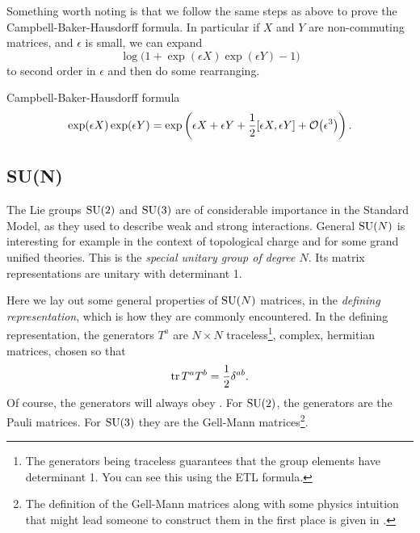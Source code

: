 Something worth noting is that we follow the same steps
as above to prove the Campbell-Baker-Hausdorff formula. In particular
if $X$ and $Y$ are non-commuting matrices, and $\epsilon$ is small,
we can expand
\begin{equation}
  \log\big(1+\exp(\epsilon X)\exp(\epsilon Y)-1\big)
\end{equation}
to second order in $\epsilon$ and then do some rearranging.
\begin{theorem}{Campbell-Baker-Hausdorff formula}{}
  $$
    \exp(\epsilon X)\exp(\epsilon Y)
      =\exp\left(\epsilon X+\epsilon Y+\frac{1}{2}[\epsilon X,\epsilon Y]
                           +\order{\epsilon^3}\right).
  $$
\end{theorem}

\subsection{SU(N)}

The Lie groups $\operatorname{SU}(2)$ and $\operatorname{SU}(3)$ are of considerable importance in the
Standard Model, as they used to describe weak and strong interactions.
General $\operatorname{SU}(N)$ is interesting for example
in the context of topological charge and for some grand unified theories.
This is the 
{\it special unitary group of degree $N$}. Its matrix
representations are unitary with determinant 1.

Here we lay out some general properties of $\operatorname{SU}(N)$ matrices,
in the {\it defining representation},
which is how they are commonly encountered.
In the defining representation, the generators $T^a$ are $N\times N$
traceless\footnote{The generators being traceless guarantees
that the group elements have determinant 1. You can see this using 
the ETL formula.}, complex, hermitian matrices, chosen so that
\begin{equation}\label{eq:SUNnorm}
\tr T^a T^b=\frac{1}{2}\delta^{ab}.
\end{equation}
Of course, the generators will always obey .
For $\operatorname{SU}(2)$, the generators are the Pauli matrices. For
$\operatorname{SU}(3)$ they are the Gell-Mann matrices\footnote{The definition
of the Gell-Mann matrices along with some physics intuition that
might lead someone to construct them in the first place
is given in .}.

